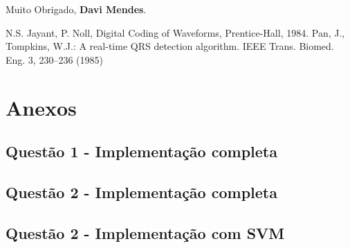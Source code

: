 \documentclass{article}
\begin{document}
Muito Obrigado, \textbf{Davi Mendes}.



\begin{thebibliography}{1}
N.S. Jayant, P. Noll, Digital Coding of Waveforms, Prentice-Hall, 1984.
Pan, J., Tompkins, W.J.: A real-time QRS detection algorithm. IEEE Trans. Biomed. Eng. 3, 230–236 (1985)
\end{thebibliography}

\newpage
\section*{Anexos}
\subsection*{Questão 1 - Implementação completa}


\subsection*{Questão 2 - Implementação completa}

\subsection*{Questão 2 - Implementação com SVM}

\end{document}
